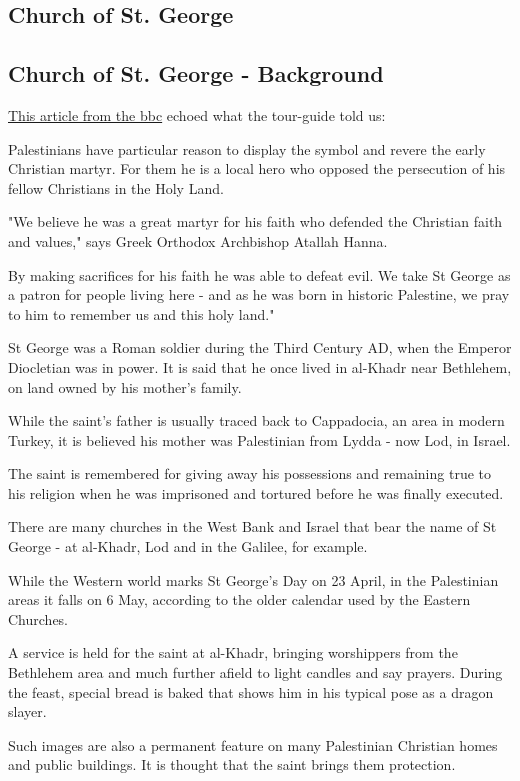 \documentclass[letterpaper]{report}
\begin{document}
\subsection{Church of St. George}
\begin{multicols}{2}
\subsection{Church of St. George - Background}
\href{http://www.bbc.com/news/magazine-27048219}{
This article from the bbc}
echoed what the tour-guide told us:

Palestinians have particular reason to display the symbol and revere the early Christian martyr. For them he is a local hero who opposed the persecution of his fellow Christians in the Holy Land.

"We believe he was a great martyr for his faith who defended the Christian faith and values," says Greek Orthodox Archbishop Atallah Hanna.

By making sacrifices for his faith he was able to defeat evil. We take St George as a patron for people living here - and as he was born in historic Palestine, we pray to him to remember us and this holy land."

St George was a Roman soldier during the Third Century AD, when the Emperor Diocletian was in power. It is said that he once lived in al-Khadr near Bethlehem, on land owned by his mother's family.

While the saint's father is usually traced back to Cappadocia, an area in modern Turkey, it is believed his mother was Palestinian from Lydda - now Lod, in Israel.

The saint is remembered for giving away his possessions and remaining true to his religion when he was imprisoned and tortured before he was finally executed.

There are many churches in the West Bank and Israel that bear the name of St George - at al-Khadr, Lod and in the Galilee, for example.

While the Western world marks St George's Day on 23 April, in the Palestinian areas it falls on 6 May, according to the older calendar used by the Eastern Churches.

A service is held for the saint at al-Khadr, bringing worshippers from the Bethlehem area and much further afield to light candles and say prayers. During the feast, special bread is baked that shows him in his typical pose as a dragon slayer.

Such images are also a permanent feature on many Palestinian Christian homes and public buildings. It is thought that the saint brings them protection.


\end{multicols}
\end{document}
